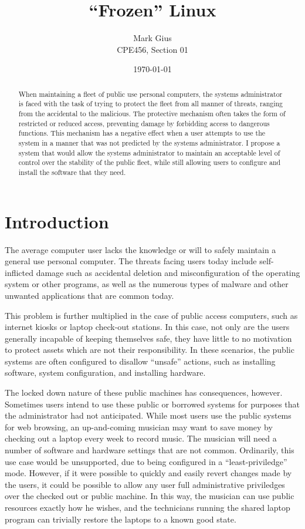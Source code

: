 \documentclass[12pt]{article}
\begin{document}
\title{``Frozen'' Linux}
\author{Mark Gius \\
        CPE456, Section 01}
\date{\today}
\maketitle

\begin{abstract}
When maintaining a fleet of public use personal computers, the systems
administrator is faced with the task of trying to protect the fleet from 
all manner of threats, ranging from the accidental to the malicious.  
The protective mechanism often takes the form of restricted or reduced 
access, preventing damage by forbidding access to dangerous functions.
This mechanism has a negative effect when a user attempts to use the system
in a manner that was not predicted by the systems administrator.
I propose a system that would allow the systems administrator to maintain
an acceptable level of control over the stability of the public fleet,
while still allowing users to configure and install the software that they
need.
\end{abstract}

\newpage
\doublespacing
\section{Introduction}
The average computer user lacks the knowledge or will to safely maintain 
a general use personal computer.  The threats facing users today include 
self-inflicted damage such as accidental deletion and misconfiguration of the 
operating system or other programs, as well as the numerous types of malware
and other unwanted applications that are common today.

This problem is further multiplied in the case of public access computers, 
such as internet kiosks or laptop check-out stations.  In this case, not 
only are the users generally incapable of keeping themselves safe, they have
little to no motivation to protect assets which are not their responsibility.
In these scenarios, the public systems are often configured to disallow 
``unsafe'' actions, such as installing software, system configuration, and
installing hardware.

The locked down nature of these public machines has consequences, however.
Sometimes users intend to use these public or borrowed systems for
purposes that the administrator had not anticipated.  While most users 
use the public systems for web browsing, an up-and-coming musician may want
to save money by checking out a laptop every week to record music.  The 
musician will need a number of software and hardware settings that are not
common.  Ordinarily, this use case would be unsupported, due to being 
configured in a ``least-priviledge'' mode.  However, if it were possible to quickly
and easily revert changes made by the users, it could be possible to 
allow any user full administrative priviledges over the checked out or 
public machine.  In this way, the musician can use public resources exactly
how he wishes, and the technicians running the shared laptop program can
trivially restore the laptops to a known good state.
\end{document}
